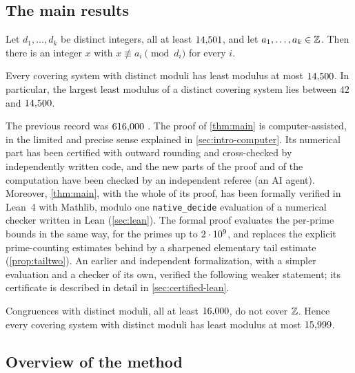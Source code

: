 \subsection{The main results}

\begin{theorem}\label{thm:main}
Let $d_1,\dots,d_k$ be distinct integers, all at least $14{,}501$, and let $a_1,\dots,a_k\in\mathbb{Z}$. Then there is an
integer $x$ with $x\not\equiv a_i \pmod{d_i}$ for every $i$.
\end{theorem}

\begin{corollary}\label{cor:main}
Every covering system with distinct moduli has least modulus at most $14{,}500$. In particular, the largest least
modulus of a distinct covering system lies between $42$ and $14{,}500$.
\end{corollary}

The previous record was $616{,}000$ \cite{BBMST}. The proof of \cref{thm:main} is computer-assisted, in the limited
and precise sense explained in \cref{sec:intro-computer}. Its numerical part has been certified with outward rounding
and cross-checked by independently written code, and the new parts of the proof and of the computation have been
checked by an independent referee (an AI agent). Moreover, \cref{thm:main}, with the whole of its proof, has been
formally verified in Lean~4 with Mathlib, modulo one \texttt{native\_decide} evaluation of a numerical checker written
in Lean (\cref{sec:lean}). The formal proof evaluates the per-prime bounds in the same way, for the primes up to
$2\cdot10^{9}$, and replaces the explicit prime-counting estimates behind \cite[Theorem~6.1]{BBMST} by a sharpened
elementary tail estimate (\cref{prop:tailtwo}). An earlier and independent formalization, with a simpler evaluation and
a checker of its own, verified the following weaker statement; its certificate is described in detail in
\cref{sec:certified-lean}.

\begin{theorem}\label{thm:lean}
Congruences with distinct moduli, all at least $16{,}000$, do not cover $\mathbb{Z}$. Hence every covering system with
distinct moduli has least modulus at most $15{,}999$.
\end{theorem}

\subsection{Overview of the method}\label{sec:intro-overview}

